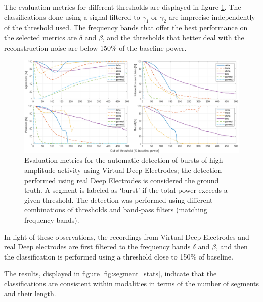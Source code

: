 \documentclass[draftcls, onecolumn, peerreview]{IEEEtran}
\begin{document}
The evaluation metrics for different thresholds are displayed in figure \ref{fig:band}.
%
The classifications done using a signal filtered to $\gamma_1$ or $\gamma_2$ are imprecise independently of the threshold used. 
%
The frequency bands that offer the best performance on the selected metrics are $\delta$ and $\beta$, and the thresholds that better deal with the reconstruction noise are below 150\% of the baseline power.

\begin{figure}[!t]
\centering
\includegraphics[width=16cm]{./img/MetricRelative}
\caption{Evaluation metrics for the automatic detection of bursts of high-amplitude activity using Virtual Deep Electrodes; the detection performed using real Deep Electrodes is considered the ground truth. 
A segment is labeled as `burst' if the total power exceeds a given threshold.
The detection was performed using different combinations of thresholds and band-pass filters (matching frequency bands).}
\label{fig:band}
\end{figure}

In light of these observations, the recordings from Virtual Deep Electrodes and real Deep electrodes are first filtered to the frequency bands $\delta$ and $\beta$, and then the classification is performed using a threshold close to 150\% of baseline.

The results, displayed in figure \ref{fig:segment_stats}, indicate that the classifications are consistent within modalities in terms of the number of segments and their length.
\end{document}

